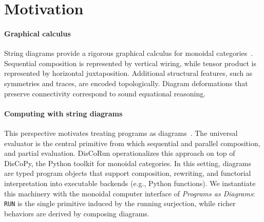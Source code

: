 \documentclass[runningheads]{llncs}
\begin{document}
\begin{abstract}







\end{abstract}
%
%
%

\section{Motivation}

\paragraph{Graphical calculus}
String diagrams provide a rigorous graphical calculus for monoidal categories~\cite{Selinger_2010}. Sequential composition is represented by vertical wiring, while tensor product is represented by horizontal juxtaposition. Additional structural features, such as symmetries and traces, are encoded topologically. Diagram deformations that preserve connectivity correspond to sound equational reasoning.

\paragraph{Computing with string diagrams}
This perspective motivates treating programs as diagrams~\cite{pavlovic2023programsdiagramscategoricalcomputability}. The universal evaluator is the central primitive from which sequential and parallel composition, and partial evaluation.
DisCoRun operationalizes this approach on top of DisCoPy, the Python toolkit for monoidal categories. In this setting, diagrams are typed program objects that support composition, rewriting, and functorial interpretation into executable backends (e.g., Python functions). We instantiate this machinery with the monoidal computer interface of \emph{Programs as Diagrams}: \texttt{RUN} is the single primitive induced by the running surjection, while richer behaviors are derived by composing diagrams.
\end{document}
